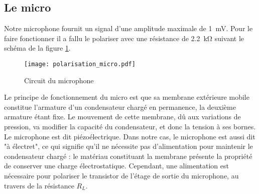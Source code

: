 \subsection{Le micro}
Notre microphone fournit un signal d'une amplitude maximale de \SI{1}{\milli\volt}. Pour le faire fonctionner il a fallu le polariser avec une résistance de \SI{2.2}{\kilo\ohm} suivant le schéma de la figure \ref{fig:polarisation du micro}.

\begin{figure}[htbp]
\centering
\texttt{[image: polarisation\_micro.pdf]}
\caption{Circuit du microphone}
\label{fig:polarisation du micro}
\end{figure}
Le principe de fonctionnement du micro est que sa membrane extérieure mobile constitue l'armature d'un condensateur chargé en permanence, la deuxième armature étant fixe. Le mouvement de cette membrane, dû aux variations de pression, va modifier la capacité du condensateur, et donc la tension à ses bornes. Le microphone est dit piézoélectrique. Dans notre cas, le microphone est aussi dit "à électret", ce qui signifie qu'il ne nécessite pas d'alimentation pour maintenir le condensateur chargé : le matériau constituant la membrane présente la propriété de conserver une charge électrostatique. Cependant, une alimentation est nécessaire pour polariser le transistor de l'étage de sortie du microphone, au travers de la résistance $R_L$. 

